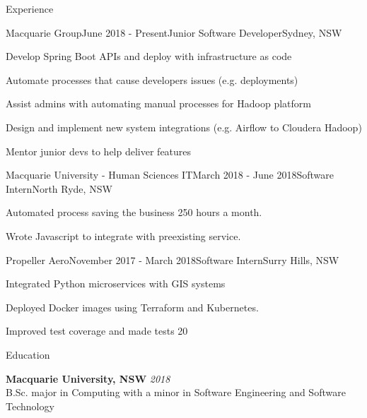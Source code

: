 \documentclass{resume} %
\begin{document}

\begin{rSection}{Experience}
    \begin{rSubsection}{Macquarie Group}{June 2018 - Present}{Junior Software Developer}{Sydney, NSW}
    \item Develop Spring Boot APIs and deploy with infrastructure as code
    \item Automate processes that cause developers issues (e.g. deployments)
    \item Assist admins with automating manual processes for Hadoop platform
    \item Design and implement new system integrations (e.g. Airflow to Cloudera Hadoop)
    \item Mentor junior devs to help deliver features
    \end{rSubsection}
    
    \begin{rSubsection}{Macquarie University - Human Sciences IT}{March 2018 - June 2018}{Software Intern}{North Ryde, NSW}
    \item Automated process saving the business 250 hours a month.
    \item Wrote Javascript to integrate with preexisting service.
    \end{rSubsection}
    
    \begin{rSubsection}{Propeller Aero}{November 2017 - March 2018}{Software Intern}{Surry Hills, NSW}
    \item Integrated Python microservices with GIS systems 
    \item Deployed Docker images using Terraform and Kubernetes.
    \item Improved test coverage and made tests 20%
    \end{rSubsection}
    
    \end{rSection}
    
    
    \begin{rSection}{Education}
    
        {\bf Macquarie University, NSW} \hfill {\em 2018} \\ 
        B.Sc. major in Computing with a minor in Software Engineering and Software Technology\\
        
        \end{rSection}
    
\end{document}
